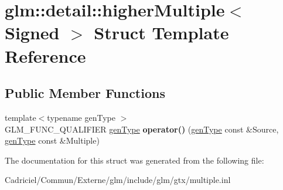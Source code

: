 \hypertarget{structglm_1_1detail_1_1higher_multiple}{}\section{glm\+:\+:detail\+:\+:higher\+Multiple$<$ Signed $>$ Struct Template Reference}
\label{structglm_1_1detail_1_1higher_multiple}
\subsection*{Public Member Functions}
\begin{DoxyCompactItemize}
\item 
{\footnotesize template$<$typename gen\+Type $>$ }\\G\+L\+M\+\_\+\+F\+U\+N\+C\+\_\+\+Q\+U\+A\+L\+I\+F\+I\+ER \hyperlink{structglm_1_1detail_1_1gen_type}{gen\+Type} {\bfseries operator()} (\hyperlink{structglm_1_1detail_1_1gen_type}{gen\+Type} const \&Source, \hyperlink{structglm_1_1detail_1_1gen_type}{gen\+Type} const \&Multiple)\hypertarget{structglm_1_1detail_1_1higher_multiple_a6361633200080a366cd84e43b30d70bb}{}\label{structglm_1_1detail_1_1higher_multiple_a6361633200080a366cd84e43b30d70bb}

\end{DoxyCompactItemize}


The documentation for this struct was generated from the following file\+:\begin{DoxyCompactItemize}
\item 
Cadriciel/\+Commun/\+Externe/glm/include/glm/gtx/multiple.\+inl\end{DoxyCompactItemize}
